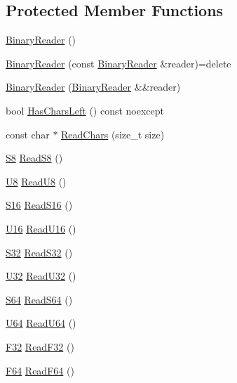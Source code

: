 \subsection*{Protected Member Functions}
\begin{DoxyCompactItemize}
\item 
\hyperlink{classmage_1_1_binary_reader_aab82579cef4f2f022273cf1adfcc8497}{Binary\+Reader} ()
\item 
\hyperlink{classmage_1_1_binary_reader_a8c1ff948f1d056439f3d8cc37d7f507c}{Binary\+Reader} (const \hyperlink{classmage_1_1_binary_reader}{Binary\+Reader} \&reader)=delete
\item 
\hyperlink{classmage_1_1_binary_reader_a3a24db5c872cca270596d53989ac8c91}{Binary\+Reader} (\hyperlink{classmage_1_1_binary_reader}{Binary\+Reader} \&\&reader)
\item 
bool \hyperlink{classmage_1_1_binary_reader_aec91fece03b619c158b133beb1bc9381}{Has\+Chars\+Left} () const noexcept
\item 
const char $\ast$ \hyperlink{classmage_1_1_binary_reader_af1e0e4ab815e23c72ab65fd7c0748d3f}{Read\+Chars} (size\+\_\+t size)
\item 
\hyperlink{namespacemage_a20766a773cfd6c14d8f2344d4631b89c}{S8} \hyperlink{classmage_1_1_binary_reader_af1628266b77efcb4e55589af90b522da}{Read\+S8} ()
\item 
\hyperlink{namespacemage_afc638980bc6154f15af5e2d93a0e0ea9}{U8} \hyperlink{classmage_1_1_binary_reader_a913fdfead6b61b17ad2d2f9f54ccf057}{Read\+U8} ()
\item 
\hyperlink{namespacemage_add9d3fe59b2a338108e98fcd67507005}{S16} \hyperlink{classmage_1_1_binary_reader_af3a7befd21ef51de83d702811c50a0b1}{Read\+S16} ()
\item 
\hyperlink{namespacemage_af69057eec1ce005c1c3b34ae33486f16}{U16} \hyperlink{classmage_1_1_binary_reader_a2b65c66fcb0b590d6f7ab5a8ffd96b83}{Read\+U16} ()
\item 
\hyperlink{namespacemage_a642e05c5c83642b6946703615cdbf2da}{S32} \hyperlink{classmage_1_1_binary_reader_a4711e731be78dbc45f223919c3ac4ff4}{Read\+S32} ()
\item 
\hyperlink{namespacemage_a41c104c036fba3756a74e19f793eeaa1}{U32} \hyperlink{classmage_1_1_binary_reader_acb2d579ef62fd3cd5b3c6193d748dda8}{Read\+U32} ()
\item 
\hyperlink{namespacemage_a38d4d411c173c8978eb356d2412b32dd}{S64} \hyperlink{classmage_1_1_binary_reader_a287d4d14b7990e1b88f9b913a39d09df}{Read\+S64} ()
\item 
\hyperlink{namespacemage_a6672cf3c861707ce4a3235a3eb43941d}{U64} \hyperlink{classmage_1_1_binary_reader_ab702702eeb211d465026482bf25601d9}{Read\+U64} ()
\item 
\hyperlink{namespacemage_aa97e833b45f06d60a0a9c4fc22ae02c0}{F32} \hyperlink{classmage_1_1_binary_reader_abb3c1af4b0e355ea3ff07de5130cc56c}{Read\+F32} ()
\item 
\hyperlink{namespacemage_ad26233bbec640deda836e572c1a23708}{F64} \hyperlink{classmage_1_1_binary_reader_a37887a659040c4a3b495eef9376352d0}{Read\+F64} ()
\end{DoxyCompactItemize}
